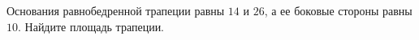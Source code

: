 \begin{ex}
	\begin{condition}
		Основания равнобедренной трапеции равны \( 14  \) и \( 26 \), а ее боковые стороны равны \( 10 \). Найдите площадь трапеции.
	\end{condition}
\end{ex}